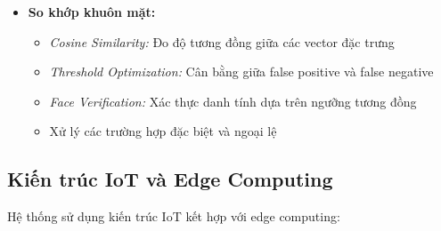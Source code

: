 \begin{itemize}
    \item \textbf{So khớp khuôn mặt:}
    \begin{itemize}
        \item \textit{Cosine Similarity:} Đo độ tương đồng giữa các vector đặc trưng
        \item \textit{Threshold Optimization:} Cân bằng giữa false positive và false negative
        \item \textit{Face Verification:} Xác thực danh tính dựa trên ngưỡng tương đồng
        \item Xử lý các trường hợp đặc biệt và ngoại lệ
    \end{itemize}
\end{itemize}

\subsection{Kiến trúc IoT và Edge Computing}
\hspace{0.5cm}Hệ thống sử dụng kiến trúc IoT kết hợp với edge computing:

